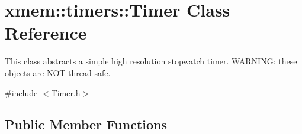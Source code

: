 \hypertarget{classxmem_1_1timers_1_1_timer}{\section{xmem\-:\-:timers\-:\-:Timer Class Reference}
\label{classxmem_1_1timers_1_1_timer}
}


This class abstracts a simple high resolution stopwatch timer. W\-A\-R\-N\-I\-N\-G\-: these objects are N\-O\-T thread safe.  




{\ttfamily \#include $<$Timer.\-h$>$}

\subsection*{Public Member Functions}
